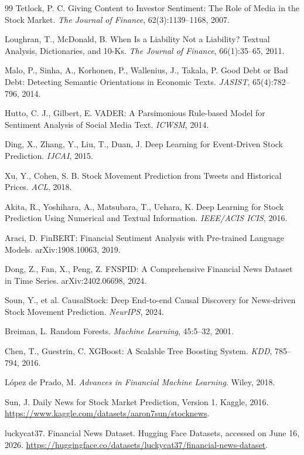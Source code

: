 \documentclass[UTF8,a4paper,10pt,twocolumn,fontset=none]{ctexart}
\begin{document}
\begin{thebibliography}{99}\scriptsize
{}
Tetlock, P. C. Giving Content to Investor Sentiment: The Role of Media in the Stock Market.
\emph{The Journal of Finance}, 62(3):1139--1168, 2007.

Loughran, T., McDonald, B. When Is a Liability Not a Liability? Textual Analysis,
Dictionaries, and 10-Ks. \emph{The Journal of Finance}, 66(1):35--65, 2011.

Malo, P., Sinha, A., Korhonen, P., Wallenius, J., Takala, P.
Good Debt or Bad Debt: Detecting Semantic Orientations in Economic Texts.
\emph{JASIST}, 65(4):782--796, 2014.

Hutto, C. J., Gilbert, E. VADER: A Parsimonious Rule-based Model for Sentiment
Analysis of Social Media Text. \emph{ICWSM}, 2014.

Ding, X., Zhang, Y., Liu, T., Duan, J. Deep Learning for Event-Driven Stock Prediction.
\emph{IJCAI}, 2015.

Xu, Y., Cohen, S. B. Stock Movement Prediction from Tweets and Historical Prices.
\emph{ACL}, 2018.

Akita, R., Yoshihara, A., Matsubara, T., Uehara, K.
Deep Learning for Stock Prediction Using Numerical and Textual Information.
\emph{IEEE/ACIS ICIS}, 2016.

Araci, D. FinBERT: Financial Sentiment Analysis with Pre-trained Language Models.
arXiv:1908.10063, 2019.

Dong, Z., Fan, X., Peng, Z. FNSPID: A Comprehensive Financial News Dataset in Time Series.
arXiv:2402.06698, 2024.

Soun, Y., et al. CausalStock: Deep End-to-end Causal Discovery for News-driven
Stock Movement Prediction. \emph{NeurIPS}, 2024.

Breiman, L. Random Forests. \emph{Machine Learning}, 45:5--32, 2001.

Chen, T., Guestrin, C. XGBoost: A Scalable Tree Boosting System.
\emph{KDD}, 785--794, 2016.

L\'opez de Prado, M. \emph{Advances in Financial Machine Learning}. Wiley, 2018.

Sun, J. Daily News for Stock Market Prediction, Version 1. Kaggle, 2016.
\url{https://www.kaggle.com/datasets/aaron7sun/stocknews}.

luckycat37. Financial News Dataset. Hugging Face Datasets, accessed on June 16, 2026.
\url{https://huggingface.co/datasets/luckycat37/financial-news-dataset}.
\end{thebibliography}
\end{document}
